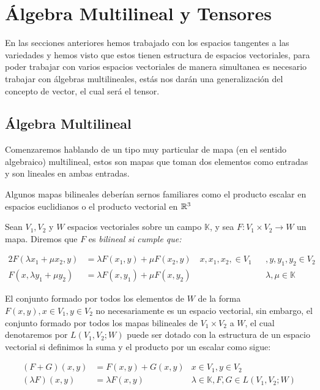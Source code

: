 \section{Álgebra Multilineal y Tensores}\label{Sección: Álgebra Multilineal y Tensores}

En las secciones anteriores hemos trabajado con los espacios tangentes a las variedades y hemos visto que estos tienen estructura de espacios vectoriales, para poder trabajar con varios espacios vectoriales de manera simultanea es necesario trabajar con álgebras multilineales, estás nos darán una generalización del concepto de vector, el cual será el tensor.

\subsection{Álgebra Multilineal}

Comenzaremos hablando de un tipo muy particular de mapa (en el sentido algebraico) multilineal, estos son mapas que toman dos elementos como entradas y son lineales en ambas entradas.

Algunos mapas bilineales deberían sernos familiares como el producto escalar en espacios euclidianos o  el producto vectorial en $\mathbb{R}^3$

\begin{definition}
  Sean $V_1,V_2$ y $W$ espacios vectoriales sobre un campo $\mathbb{K}$, y sea $F: V_1 \times V_2 \to W$ un mapa. Diremos que $F$ es \it{bilineal} si cumple que:

\begin{alignat*}{2}
  F(\lambda x_1 + \mu x_2, y) &= \lambda F(x_1,y) + \mu F(x_2,y)  \quad x,x_1,x_2, \in V_1 &&, y,y_1,y_2 \in V_2\\
  F(x, \lambda y_1 + \mu y_2) &= \lambda F(x,y_1) + \mu F(x,y_2) \quad &&\lambda ,\mu \in \mathbb{K}
\end{alignat*}
\end{definition}

El conjunto formado por todos los elementos de $W$ de la forma $F(x,y), x\in V_1, y\in V_2$ no necesariamente es un espacio vectorial, sin embargo, el conjunto formado por todos los mapas bilineales de $V_1\times V_2$ a $W$, el cual denotaremos por $L(V_1,V_2;W)$ puede ser dotado con la estructura de un espacio vectorial si definimos la suma y el producto por un escalar como sigue:

\begin{align*}
  (F + G)(x,y) &= F(x,y) + G(x,y) & x\in V_1, y\in V_2\\
  (\lambda F)(x,y) &= \lambda F(x,y) & \lambda \in \mathbb{K}, F,G \in L(V_1,V_2;W)
\end{align*}

